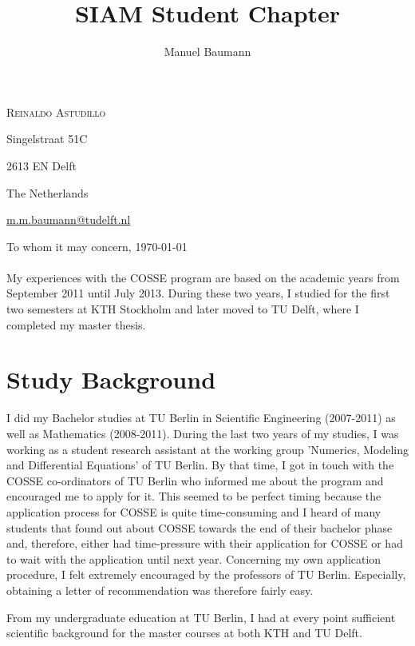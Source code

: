 \documentclass{article}
\title{\bf SIAM Student Chapter }
\author{Manuel Baumann}
\begin{document}
\hfill \textsc{Reinaldo Astudillo}

\hfill Singelstraat 51C

\hfill 2613 EN Delft

\hfill The Netherlands

\hfill

\hfill \href{mailto:m.m.baumann@tudelft.nl}{m.m.baumann@tudelft.nl}


\vspace{2cm}

To whom it may concern, \hfill \today
\\ \\
My experiences with the COSSE program are based on the academic years from September 2011 until July 2013. During these two years, I studied for the first two semesters at KTH Stockholm and later moved to TU Delft, where I completed my master thesis.
\section*{Study Background}
I did my Bachelor studies at TU Berlin in Scientific Engineering (2007-2011) as well as Mathematics (2008-2011). During the last two years of my studies, I was working as a student research assistant at the working group 'Numerics, Modeling and Differential Equations' of TU Berlin. By that time, I got in touch with the COSSE co-ordinators of TU Berlin who informed me about the program and encouraged me to apply for it. This seemed to be perfect timing because the application process for COSSE is quite time-consuming and I heard of many students that found out about COSSE towards the end of their bachelor phase and, therefore, either had time-pressure with their application for COSSE or had to wait with the application until next year. Concerning my own application procedure, I felt extremely encouraged by the professors of TU Berlin. Especially, obtaining a letter of recommendation was therefore fairly easy.

From my undergraduate education at TU Berlin, I had at every point sufficient scientific background for the master courses at both KTH and TU Delft.
\end{document}
